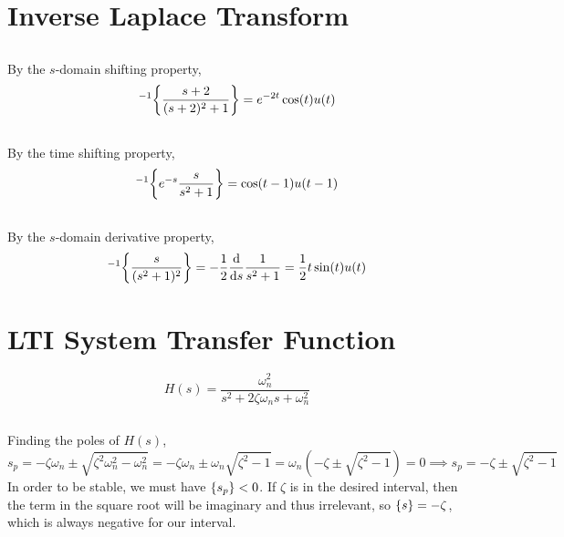 \documentclass{article}
\let\L\relax
\DeclareMathOperator{\L}{\mathcal{L}}
\let\Re\relax
\DeclareMathOperator{\Re}{\mathfrak{R}}
\begin{document}
\section{Inverse Laplace Transform}

\subsection{}

By the \(s\)-domain shifting property,
\begin{equation}
    \L^{-1}\qty{\frac{s + 2}{(s + 2)^2 + 1}} = e^{-2t} \cos(t) u(t)
\end{equation}

\subsection{}

By the time shifting property,
\begin{equation}
    \L^{-1}\qty{e^{-s} \frac{s}{s^2 + 1}} = \cos(t - 1) u(t - 1)
\end{equation}

\subsection{}

By the \(s\)-domain derivative property,
\begin{equation}
    \L^{-1}\qty{\frac{s}{(s^2 + 1)^2}} = -\frac{1}{2} \dv{s} \frac{1}{s^2 + 1} = \frac{1}{2} t \sin(t) u(t)
\end{equation}

\section{LTI System Transfer Function}

\begin{equation}
    H(s) = \frac{\omega_n^2}{s^2 + 2\zeta \omega_n s + \omega_n^2}
\end{equation}

\subsection{}

Finding the poles of \(H(s)\),
\begin{equation}
    s_p = -\zeta \omega_n \pm \sqrt{\zeta^2 \omega_n^2 - \omega_n^2} = -\zeta \omega_n \pm \omega_n \sqrt{\zeta^2 - 1} = \omega_n (-\zeta \pm \sqrt{\zeta^2 - 1}) = 0 \implies s_p = -\zeta \pm \sqrt{\zeta^2 - 1}
\end{equation}
In order to be stable, we must have \(\Re\{s_p\} < 0\).
If \(\zeta\) is in the desired interval, then the term in the square root will be imaginary and thus irrelevant, so \(\Re\{s\} = -\zeta\), which is always negative for our interval.
\end{document}
